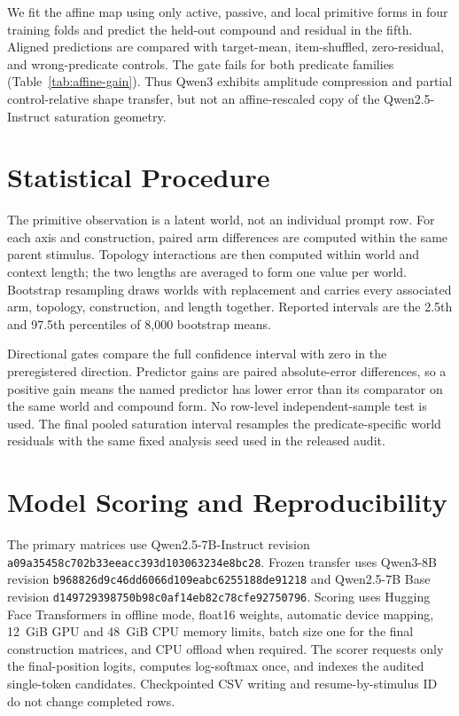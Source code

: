 We fit the affine map using only active, passive, and local primitive forms in
four training folds and predict the held-out compound and residual in the
fifth. Aligned predictions are compared with target-mean, item-shuffled,
zero-residual, and wrong-predicate controls. The gate fails for both predicate
families (Table~\ref{tab:affine-gain}). Thus Qwen3 exhibits amplitude
compression and partial control-relative shape transfer, but not an
affine-rescaled copy of the Qwen2.5-Instruct saturation geometry.




\section{Statistical Procedure}
\label{app:statistics}

The primitive observation is a latent world, not an individual prompt row. For
each axis and construction, paired arm differences are computed within the same
parent stimulus. Topology interactions are then computed within world and
context length; the two lengths are averaged to form one value per world.
Bootstrap resampling draws worlds with replacement and carries every associated
arm, topology, construction, and length together. Reported intervals are the
2.5th and 97.5th percentiles of 8,000 bootstrap means.

Directional gates compare the full confidence interval with zero in the
preregistered direction. Predictor gains are paired absolute-error differences,
so a positive gain means the named predictor has lower error than its comparator
on the same world and compound form. No row-level independent-sample test is
used. The final pooled saturation interval resamples the predicate-specific
world residuals with the same fixed analysis seed used in the released audit.

\section{Model Scoring and Reproducibility}
\label{app:reproducibility}

The primary matrices use Qwen2.5-7B-Instruct revision
\newline\texttt{a09a35458c702b33eeacc393d103063234e8bc28}. Frozen transfer uses
Qwen3-8B revision
\newline\texttt{b968826d9c46dd6066d109eabc6255188de91218} and Qwen2.5-7B Base
revision \newline\texttt{d149729398750b98c0af14eb82c78cfe92750796}. Scoring uses Hugging Face
Transformers in offline mode, float16 weights, automatic device mapping,
12~GiB GPU and 48~GiB CPU memory limits, batch size one for the final
construction matrices, and CPU offload when required. The scorer requests only
the final-position logits, computes log-softmax once, and indexes the audited
single-token candidates. Checkpointed CSV writing and resume-by-stimulus ID do
not change completed rows.

